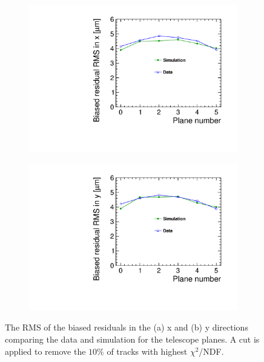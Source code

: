 \begin{figure}[htbp] \centering
  \begin{subfigure}[b]{0.45\textwidth}
    \includegraphics[width=\textwidth]{figures/Telescope/biasedResiduals/RMSX_simu_vs_data.pdf}
    \caption{}
  \end{subfigure}\hfill
  \begin{subfigure}[b]{0.45\textwidth}
    \includegraphics[width=\textwidth]{figures/Telescope/biasedResiduals/RMSY_simu_vs_data.pdf}
    \caption{}
  \end{subfigure}
  \caption{The RMS of the biased residuals in the (a) x and (b) y directions
    comparing the data and simulation for the telescope planes. A cut
    is applied to remove the $10\%$ of tracks with highest
    $\chi^2$/NDF.}
  \label{fig:telescopeBiasedRMS_data_simu}
\end{figure}


